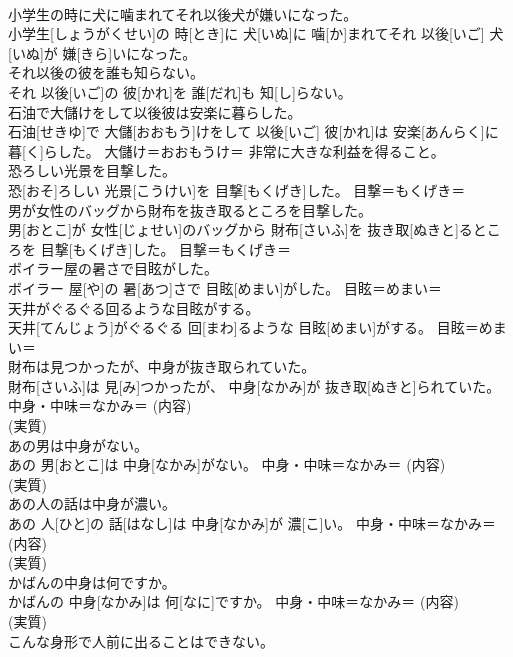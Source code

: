 \documentclass[8pt]{extreport}
\begin{document}
\begin{CJK}{UTF8}{min}
{\\	小学生の時に犬に噛まれてそれ以後犬が嫌いになった。	
\\	小学生[しょうがくせい]の 時[とき]に 犬[いぬ]に 噛[か]まれてそれ 以後[いご] 犬[いぬ]が 嫌[きら]いになった。	
\\	それ以後の彼を誰も知らない。	
\\	それ 以後[いご]の 彼[かれ]を 誰[だれ]も 知[し]らない。	
\\	石油で大儲けをして以後彼は安楽に暮らした。	
\\	石油[せきゆ]で 大儲[おおもう]けをして 以後[いご] 彼[かれ]は 安楽[あんらく]に 暮[く]らした。	大儲け＝おおもうけ＝ 非常に大きな利益を得ること。
\\	恐ろしい光景を目撃した。	
\\	恐[おそ]ろしい 光景[こうけい]を 目撃[もくげき]した。	目撃＝もくげき＝ 
\\	男が女性のバッグから財布を抜き取るところを目撃した。	
\\	男[おとこ]が 女性[じょせい]のバッグから 財布[さいふ]を 抜き取[ぬきと]るところを 目撃[もくげき]した。	目撃＝もくげき＝ 
\\	ボイラー屋の暑さで目眩がした。	
\\	ボイラー 屋[や]の 暑[あつ]さで 目眩[めまい]がした。	目眩＝めまい＝ 
\\	天井がぐるぐる回るような目眩がする。	
\\	天井[てんじょう]がぐるぐる 回[まわ]るような 目眩[めまい]がする。	目眩＝めまい＝ 
\\	財布は見つかったが、中身が抜き取られていた。	
\\	財布[さいふ]は 見[み]つかったが、 中身[なかみ]が 抜き取[ぬきと]られていた。	中身・中味＝なかみ＝ (内容) 
\\	(実質) 
\\	あの男は中身がない。	
\\	あの 男[おとこ]は 中身[なかみ]がない。	中身・中味＝なかみ＝ (内容) 
\\	(実質) 
\\	あの人の話は中身が濃い。	
\\	あの 人[ひと]の 話[はなし]は 中身[なかみ]が 濃[こ]い。	中身・中味＝なかみ＝ (内容) 
\\	(実質) 
\\	かばんの中身は何ですか。	
\\	かばんの 中身[なかみ]は 何[なに]ですか。	中身・中味＝なかみ＝ (内容) 
\\	(実質) 
\\	こんな身形で人前に出ることはできない。	
}
\end{CJK}
\end{document}
